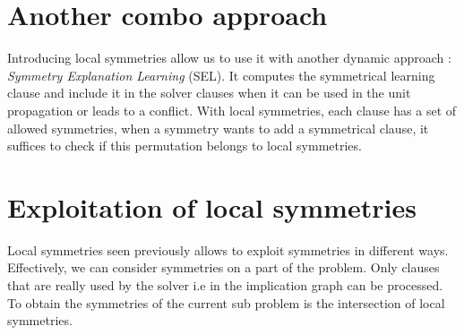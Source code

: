 
\section{Another combo approach}
Introducing local symmetries allow us to use it with another dynamic approach : 
\textit{Symmetry Explanation Learning} (SEL). It computes the symmetrical learning clause and
include it in the solver clauses when it can be used in the unit propagation or leads to a conflict.
With local symmetries, each clause has a set of allowed symmetries, when a symmetry wants to 
add a symmetrical clause, it suffices to check if this permutation belongs to local symmetries.

 
\section{Exploitation of local symmetries}
Local symmetries seen previously allows to exploit symmetries in different ways.
Effectively, we can consider symmetries on a part of the problem. Only clauses that are really used
by the solver i.e in the implication graph can be processed.
To obtain the symmetries of the current sub problem is the intersection of local symmetries.
